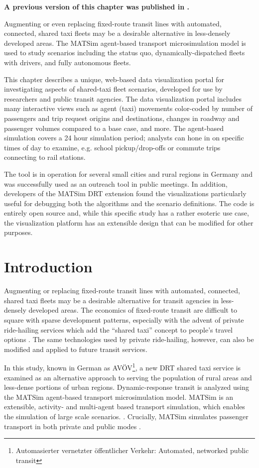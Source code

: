 \textbf{A previous version of this chapter was published in \citet{CharltonLeichKaddoura2021avoev}.}

Augmenting or even replacing fixed-route transit lines with automated, connected, shared taxi fleets may be a desirable alternative in less-densely developed areas. The MATSim agent-based transport microsimulation model is used to study scenarios including the status quo, dynamically-dispatched fleets with drivers, and fully autonomous fleets.

This chapter describes a unique, web-based data visualization portal for investigating aspects of shared-taxi fleet scenarios, developed for use by researchers and public transit agencies. The data visualization portal includes many interactive views such as agent (taxi) movements color-coded by number of passengers and trip request origins and destinations, changes in roadway and passenger volumes compared to a base case, and more. The agent-based simulation covers a 24 hour simulation period; analysts can hone in on specific times of day to examine, e.g. school pickup/drop-offs or commute trips connecting to rail stations.

The tool is in operation for several small cities and rural regions in Germany and was successfully used as an outreach tool in public meetings. In addition, developers of the MATSim DRT extension found the visualizations particularly useful for debugging both the algorithms and the scenario definitions. The code is entirely open source and, while this specific study has a rather esoteric use case, the visualization platform has an extensible design that can be modified for other purposes.

\section{Introduction}
\label{avov-introduction}

Augmenting or replacing fixed-route transit lines with automated, connected, shared taxi fleets may be a desirable alternative for transit agencies in less-densely developed areas. The economics of fixed-route transit are difficult to square with sparse development patterns, especially with the advent of private ride-hailing services which add the ``shared taxi'' concept to people's travel options \cite{Hough2018}. The same technologies used by private ride-hailing, however, can also be modified and applied to future transit services.

In this study, known in German as AVÖV\footnote{Automasierter vernetzter öffentlicher Verkehr: Automated, networked public transit}, a new \gls{DRT} shared taxi service is examined as an alternative approach to serving the population of rural areas and less-dense portions of urban regions. Dynamic-response transit is analyzed using the \gls{MATSim} agent-based transport microsimulation model. MATSim is an extensible, activity- and multi-agent based transport simulation, which enables the simulation of large scale scenarios. \cite{MATSimBook}. Crucially, MATSim simulates passenger transport in both private and public modes \cite{ZiemkeEtAl2019OpenBerlinScenario}.

